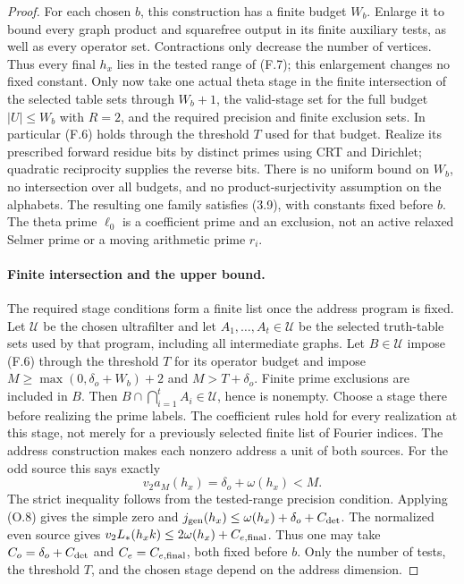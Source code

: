 \begin{proof}\leavevmode
For each chosen $b$, this construction has a finite budget $W_b$.
Enlarge it to bound every graph product and squarefree output in its
finite auxiliary tests, as well as every operator set. Contractions
only decrease the number of vertices. Thus every final $h_x$ lies in
the tested range of (F.7); this enlargement changes no fixed constant.
Only now take one actual theta stage in the finite intersection
of the selected table sets through $W_b+1$, the valid-stage set
for the full budget $|U|\le W_b$ with $R=2$, and the required
precision and finite exclusion sets.  In particular (F.6) holds
through the threshold $T$ used for that budget.
Realize its prescribed forward residue bits by distinct primes using CRT and Dirichlet;
quadratic reciprocity supplies the reverse bits.
There is no uniform bound on $W_b$, no intersection over all
budgets, and no product-surjectivity assumption on the alphabets.
The resulting one family satisfies (3.9), with constants fixed
before $b$. The theta prime $\ell_0$ is a coefficient prime and
an exclusion, not an active relaxed Selmer prime or a moving
arithmetic prime $r_i$.
\paragraph{Finite intersection and the upper bound.}
The required stage conditions form a finite list once the address
program is fixed. Let $\mathcal U$ be the chosen ultrafilter and
let $A_1,\ldots,A_t\in\mathcal U$ be the selected truth-table
sets used by that program, including all intermediate graphs.
Let $B\in\mathcal U$ impose (F.6) through the threshold $T$
for its operator budget and impose
$M\ge\max(0,\delta_o+W_b)+2$ and $M>T+\delta_o$.
Finite prime exclusions are included in $B$.
Then $B\cap\bigcap_{i=1}^t A_i\in\mathcal U$, hence is nonempty.
Choose a stage there before realizing the prime labels. The
coefficient rules hold for every realization at this stage, not
merely for a previously selected finite list of Fourier indices.
The address construction makes each nonzero address a unit of
both sources. For the odd source this says exactly
\[
 v_2a_M(h_x)=\delta_o+\omega(h_x)<M.
\]
The strict inequality follows from the tested-range precision
condition. Applying (O.8) gives the simple zero and
$j_{\rm gen}(h_x)\le\omega(h_x)+\delta_o+C_{\rm det}$.
The normalized even source gives
$v_2L_*(h_xk)\le2\omega(h_x)+C_{e,\rm final}$.
Thus one may take $C_o=\delta_o+C_{\rm det}$ and
$C_e=C_{e,\rm final}$, both fixed before $b$. Only the number
of tests, the threshold $T$, and the chosen stage depend on the
address dimension.
\end{proof}

